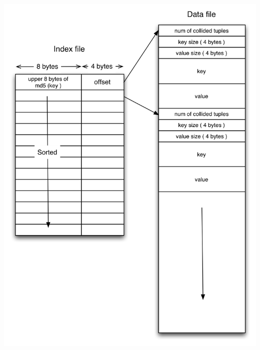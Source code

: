 \documentclass[10pt,twocolumn,preprint,natbib,authoryear]{sigplanconf}
\begin{document}
\begin{center}
\includegraphics[scale=0.50]{storage_format.png}
\end{center}
\end{document}
